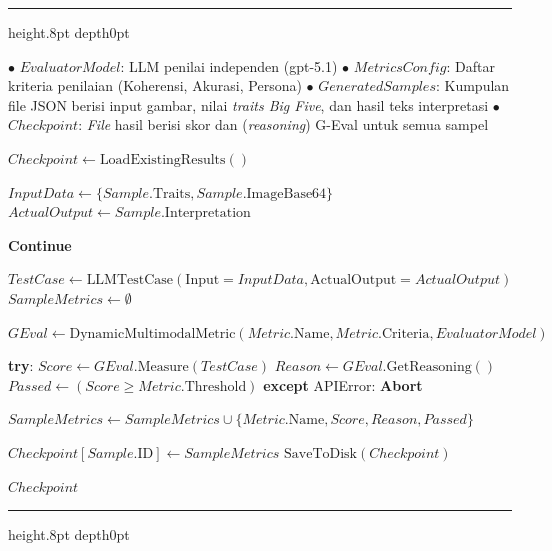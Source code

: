 {
	\vspace{2ex}
	\hrule height.8pt depth0pt \kern5pt
	
	\begin{algorithmic}[1]
		\Input 
		\Statex $\bullet$ $EvaluatorModel$: LLM penilai independen (gpt-5.1)
		\Statex $\bullet$ $MetricsConfig$: Daftar kriteria penilaian (Koherensi, Akurasi, Persona)
		\Statex $\bullet$ $GeneratedSamples$: Kumpulan file JSON berisi input gambar, nilai \textit{traits Big Five}, dan hasil teks interpretasi
		\Output 
		\Statex $\bullet$ $Checkpoint$: \textit{File} hasil berisi skor dan (\textit{reasoning}) G-Eval untuk semua sampel
		
		\State $Checkpoint \gets \text{LoadExistingResults}()$ 
		
		\State $InputData \gets \{Sample.\text{Traits}, Sample.\text{ImageBase64}\}$
		\State $ActualOutput \gets Sample.\text{Interpretation}$
		
		\State \textbf{Continue} 
		\EndIf
		
		\State $TestCase \gets \text{LLMTestCase}(\text{Input}=InputData, \text{ActualOutput}=ActualOutput)$
		\State $SampleMetrics \gets \emptyset$
		
		\State $GEval \gets \text{DynamicMultimodalMetric}(Metric.\text{Name}, Metric.\text{Criteria}, EvaluatorModel)$
		
		\State \textbf{try}:
		\State \quad $Score \gets GEval.\text{Measure}(TestCase)$ 
		\State \quad $Reason \gets GEval.\text{GetReasoning}()$ 
		\State \quad $Passed \gets (Score \ge Metric.\text{Threshold})$
		\State \textbf{except} APIError:
		\State \quad \textbf{Abort} 
		
		\State $SampleMetrics \gets SampleMetrics \cup \{Metric.\text{Name}, Score, Reason, Passed\}$
		\EndFor
		
		\State $Checkpoint[Sample.\text{ID}] \gets SampleMetrics$
		\State $\text{SaveToDisk}(Checkpoint)$ 
		
		\EndFor
		
		\State \Return $Checkpoint$
		\EndProcedure
	\end{algorithmic}
	
	\nopagebreak
	\kern2pt\hrule height.8pt depth0pt \kern15pt 
	\nopagebreak
	
	\label{alg:g-eval-pipeline}
}